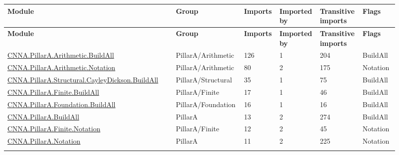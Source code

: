 \footnotesize
{}
\begin{longtable}{L{0.42\linewidth} L{0.16\linewidth} L{0.07\linewidth} L{0.08\linewidth} L{0.1\linewidth} L{0.09\linewidth}}
\hline
\textbf{Module} & \textbf{Group} & \textbf{Imports} & \textbf{Imported by} & \textbf{Transitive imports} & \textbf{Flags}\\
\hline
\endfirsthead
\hline
\textbf{Module} & \textbf{Group} & \textbf{Imports} & \textbf{Imported by} & \textbf{Transitive imports} & \textbf{Flags}\\
\hline
\endhead
\href{run:repo_snapshot/CNNA/PillarA/Arithmetic/BuildAll.lean}{CNNA.\allowbreak{}PillarA.\allowbreak{}Arithmetic.\allowbreak{}BuildAll} & PillarA/\allowbreak{}Arithmetic & 126 & 1 & 204 & BuildAll\\
\hline
\addlinespace[0.24em]
\href{run:repo_snapshot/CNNA/PillarA/Arithmetic/Notation.lean}{CNNA.\allowbreak{}PillarA.\allowbreak{}Arithmetic.\allowbreak{}Notation} & PillarA/\allowbreak{}Arithmetic & 80 & 2 & 175 & Notation\\
\hline
\addlinespace[0.24em]
\href{run:repo_snapshot/CNNA/PillarA/Structural/CayleyDickson/BuildAll.lean}{CNNA.\allowbreak{}PillarA.\allowbreak{}Structural.\allowbreak{}CayleyDickson.\allowbreak{}BuildAll} & PillarA/\allowbreak{}Structural & 35 & 1 & 75 & BuildAll\\
\hline
\addlinespace[0.24em]
\href{run:repo_snapshot/CNNA/PillarA/Finite/BuildAll.lean}{CNNA.\allowbreak{}PillarA.\allowbreak{}Finite.\allowbreak{}BuildAll} & PillarA/\allowbreak{}Finite & 17 & 1 & 46 & BuildAll\\
\hline
\addlinespace[0.24em]
\href{run:repo_snapshot/CNNA/PillarA/Foundation/BuildAll.lean}{CNNA.\allowbreak{}PillarA.\allowbreak{}Foundation.\allowbreak{}BuildAll} & PillarA/\allowbreak{}Foundation & 16 & 1 & 16 & BuildAll\\
\hline
\addlinespace[0.24em]
\href{run:repo_snapshot/CNNA/PillarA/BuildAll.lean}{CNNA.\allowbreak{}PillarA.\allowbreak{}BuildAll} & PillarA & 13 & 2 & 274 & BuildAll\\
\hline
\addlinespace[0.24em]
\href{run:repo_snapshot/CNNA/PillarA/Finite/Notation.lean}{CNNA.\allowbreak{}PillarA.\allowbreak{}Finite.\allowbreak{}Notation} & PillarA/\allowbreak{}Finite & 12 & 2 & 45 & Notation\\
\hline
\addlinespace[0.24em]
\href{run:repo_snapshot/CNNA/PillarA/Notation.lean}{CNNA.\allowbreak{}PillarA.\allowbreak{}Notation} & PillarA & 11 & 2 & 225 & Notation\\
\hline
\addlinespace[0.24em]

\end{longtable}
